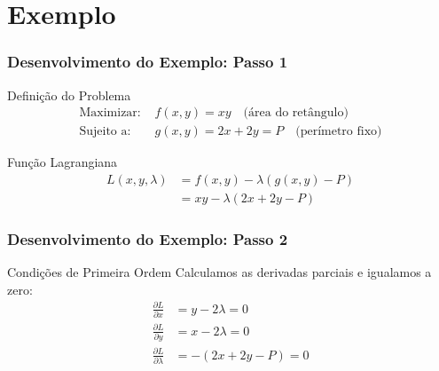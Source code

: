 \documentclass[11pt]{beamer}
\begin{document}
\section{Exemplo}


\begin{frame}
\frametitle{Desenvolvimento do Exemplo: Passo 1}
\large
\begin{block}{Definição do Problema}
\begin{align*}
\text{Maximizar: } & f(x,y) = xy \quad \text{(área do retângulo)} \\
\text{Sujeito a: } & g(x,y) = 2x + 2y = P \quad \text{(perímetro fixo)}
\end{align*}
\end{block}

\begin{block}{Função Lagrangiana}
\begin{align*}
L(x,y,\lambda) &= f(x,y) - \lambda(g(x,y) - P) \\
&= xy - \lambda(2x + 2y - P)
\end{align*}
\end{block}
\end{frame}

\begin{frame}
\frametitle{Desenvolvimento do Exemplo: Passo 2}
\large
\begin{block}{Condições de Primeira Ordem}
Calculamos as derivadas parciais e igualamos a zero:
\begin{align*}
\frac{\partial L}{\partial x} &= y - 2\lambda = 0 \\
\frac{\partial L}{\partial y} &= x - 2\lambda = 0 \\
\frac{\partial L}{\partial \lambda} &= -(2x + 2y - P) = 0
\end{align*}
\end{block}
\end{frame}
\end{document}
